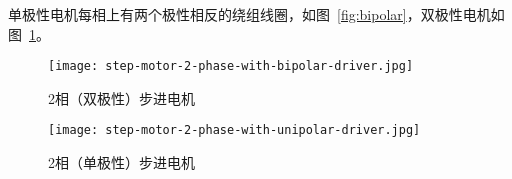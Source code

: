 单极性电机每相上有两个极性相反的绕组线圈，如图~\ref{fig:bipolar}，双极性电机如图~\ref{fig:unipolar}。

\begin{figure}[htbp]
    \begin{minipage}{0.48\textwidth}
      \centering
      \texttt{[image: step-motor-2-phase-with-bipolar-driver.jpg]}
      \caption{2相（双极性）步进电机}
      \label{fig:bipolar}
    \end{minipage}\hfill
    \begin{minipage}{0.48\textwidth}
      \centering
      \texttt{[image: step-motor-2-phase-with-unipolar-driver.jpg]}
      \caption{2相（单极性）步进电机}
      \label{fig:unipolar}
    \end{minipage}
\end{figure}













